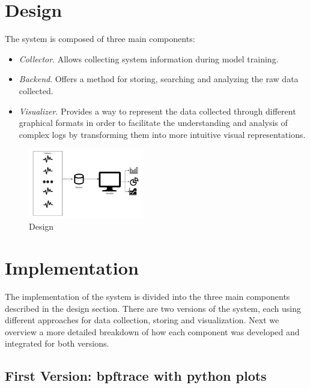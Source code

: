 \documentclass[conference]{IEEEtran}
\begin{document}
\section{Design}
The system is composed of three main components:
\begin{itemize}
	\item \textit{Collector}. Allows collecting system information during model training.
	\item \textit{Backend}. Offers a method for storing, searching and analyzing the raw data collected.
	\item \textit{Visualizer}. Provides a way to represent the data collected through different graphical formats in order to facilitate the understanding and analysis of complex logs by transforming them into more intuitive visual representations.
\end{itemize}


\begin{figure}[htbp]
    \centering
	\includegraphics[width=0.45\textwidth]{images/DesignPI.pdf}
    \caption{Design}
    \label{fig:Design}
\end{figure}

\section{Implementation}
The implementation of the system is divided into the three main components described in the design section.
There are two versions of the system, each using different approaches for data collection, storing and visualization.
Next we overview a more detailed breakdown of how each component was developed and integrated for both versions.

\subsection{First Version: bpftrace with python plots} %
\end{document}
